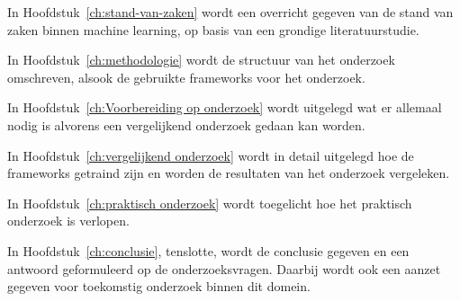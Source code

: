 In Hoofdstuk~\ref{ch:stand-van-zaken} wordt een overricht gegeven van de stand van zaken binnen machine learning, op basis van een grondige literatuurstudie. 

In Hoofdstuk~\ref{ch:methodologie} wordt de structuur van het onderzoek omschreven, alsook de gebruikte frameworks voor het onderzoek.

In Hoofdstuk~\ref{ch:Voorbereiding op onderzoek} wordt uitgelegd wat er allemaal nodig is alvorens een vergelijkend onderzoek gedaan kan worden. 

In Hoofdstuk~\ref{ch:vergelijkend onderzoek} wordt in detail uitgelegd hoe de frameworks getraind zijn en worden de resultaten van het onderzoek vergeleken.

In Hoofdstuk~\ref{ch:praktisch onderzoek} wordt toegelicht hoe het praktisch onderzoek is verlopen.

In Hoofdstuk~\ref{ch:conclusie}, tenslotte, wordt de conclusie gegeven en een antwoord geformuleerd op de onderzoeksvragen. Daarbij wordt ook een aanzet gegeven voor toekomstig onderzoek binnen dit domein.



